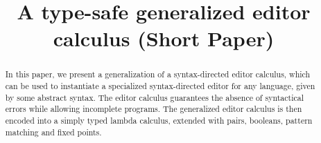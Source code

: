 \documentclass[sigplan,anonymous,review]{acmart}
\begin{document}
\title{A type-safe generalized editor calculus (Short Paper)}
























\renewcommand{\shortauthors}{AAU Bachelor}

\begin{abstract}
In this paper, we present a generalization of a syntax-directed editor calculus, which can be used to instantiate a specialized syntax-directed editor for any language, given by some abstract syntax. The editor calculus guarantees the absence of syntactical errors while allowing incomplete programs. The generalized editor calculus is then encoded into a simply typed lambda calculus, extended with pairs, booleans, pattern matching and fixed points.
\end{abstract}
\end{document}
